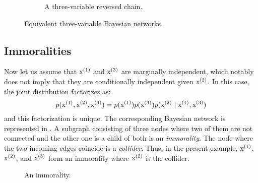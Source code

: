\begin{figure}
\begin{subfigure}[t]{0.32\textwidth}
{}
        \caption{A three-variable reversed chain.}
        \label{fig:revchain_bayesian_net}
    \end{subfigure}
    \caption{Equivalent three-variable Bayesian networks.}
    \label{fig:equiv_bayesian_nets}
\end{figure}

\subsection{Immoralities}
\label{sec:immoralities}
Now let us assume that ${\textnormal{x}}^{(1)}$ and ${\textnormal{x}}^{(3)}$ are marginally independent, which notably does not imply that they are conditionally independent given ${\textnormal{x}}^{(2)}$. In this case, the joint distribution factorizes as:
\begin{equation}
    p({\textnormal{x}}^{(1)}, {\textnormal{x}}^{(2)}, {\textnormal{x}}^{(3)}) = p({\textnormal{x}}^{(1)}) p({\textnormal{x}}^{(3)}) p({\textnormal{x}}^{(2)} \mid {\textnormal{x}}^{(1)}, {\textnormal{x}}^{(3)})
\end{equation}
and this factorization is unique. The corresponding Bayesian network is represented in . A subgraph consisting of three nodes where two of them are not  connected and the other one is a child of both is an \emph{immorality}. The node where the two incoming edges coincide is a \emph{collider}. Thus, in the present example, ${\textnormal{x}}^{(1)}$, ${\textnormal{x}}^{(2)}$, and ${\textnormal{x}}^{(3)}$ form an immorality where ${\textnormal{x}}^{(2)}$ is the collider.

\begin{figure}
    \centering
    \caption{An immorality.}
    \label{fig:immorality_bayesian_net}
\end{figure}

